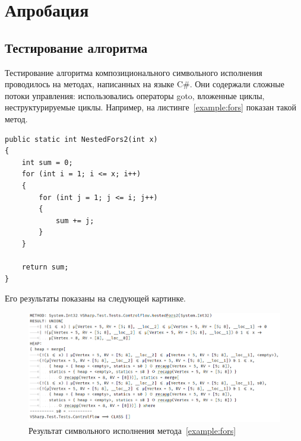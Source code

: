 \section{Апробация}
\subsection{Тестирование алгоритма}
Тестирование алгоритма композиционального символьного исполнения проводилось на методах, написанных на языке C\#.
Они содержали сложные потоки управления: использовались операторы goto, вложенные циклы, неструктурируемые циклы.
Например, на листинге~\ref{example:fors} показан такой метод.
\begin{lstlisting}[language={[Sharp]C}, caption={Программа, содержащая вложенные циклы},captionpos=b,
label={example:fors}]
public static int NestedFors2(int x)
{
    int sum = 0;
    for (int i = 1; i <= x; i++)
    {
        for (int j = 1; j <= i; j++)
        {
            sum += j;
        }
    }

    return sum;
}
\end{lstlisting}

Его результаты показаны на следующей картинке.
\begin{figure}
\centering
\includegraphics[scale=0.5]{Batoev/images/results.PNG}
\caption{Результат символьного исполнения метода~\ref{example:fors}}
\end{figure}

